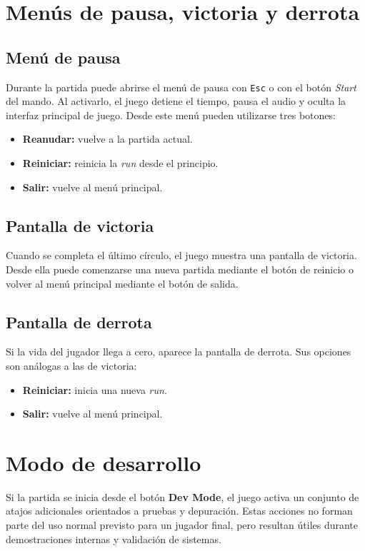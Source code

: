 \section{Menús de pausa, victoria y derrota}
\subsection{Menú de pausa}
Durante la partida puede abrirse el menú de pausa con \texttt{Esc} o con el botón
\textit{Start} del mando. Al activarlo, el juego detiene el tiempo, pausa el audio y oculta
la interfaz principal de juego. Desde este menú pueden utilizarse tres botones:

\begin{itemize}
    \item \textbf{Reanudar:} vuelve a la partida actual.
    \item \textbf{Reiniciar:} reinicia la \textit{run} desde el principio.
    \item \textbf{Salir:} vuelve al menú principal.
\end{itemize}

\subsection{Pantalla de victoria}
Cuando se completa el último círculo, el juego muestra una pantalla de victoria. Desde ella
puede comenzarse una nueva partida mediante el botón de reinicio o volver al menú principal
mediante el botón de salida.

\subsection{Pantalla de derrota}
Si la vida del jugador llega a cero, aparece la pantalla de derrota. Sus opciones son
análogas a las de victoria:

\begin{itemize}
    \item \textbf{Reiniciar:} inicia una nueva \textit{run}.
    \item \textbf{Salir:} vuelve al menú principal.
\end{itemize}

\section{Modo de desarrollo}
Si la partida se inicia desde el botón \textbf{Dev Mode}, el juego activa un conjunto de
atajos adicionales orientados a pruebas y depuración. Estas acciones no forman parte del uso
normal previsto para un jugador final, pero resultan útiles durante demostraciones internas y
validación de sistemas.

